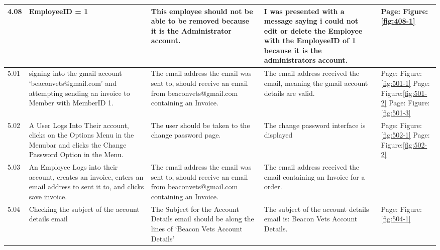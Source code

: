 \begin{flushleft}
\begin{longtable}{|p{1.0cm}|p{2.5cm}|p{3cm}|p{3.0cm}|p{2.5cm}|}
	4.08 &  EmployeeID = 1 & This employee should not be able to be removed because it is the Administrator account.& I was presented with a message saying i could not edit or delete the Employee with the EmployeeID of 1 because it is the administrators account. &  Page:\pageref{fig:408-1}  \newline Figure:\ref{fig:408-1}\\ \hline
	5.01 &  signing into the gmail account `beaconvets@gmail.com' and attempting sending an invoice to Member with MemberID 1.  & The email address the email was sent to, should receive an email from beaconvets@gmail.com containing an Invoice. & The email address received the email, meaning the gmail account details are valid. & Page:\pageref{fig:501-1}  \newline Figure:\ref{fig:501-1} \newline \newline  Page:\pageref{fig:501-2}  \newline Figure:\ref{fig:501-2}  \newline \newline  Page:\pageref{fig:501-3}  \newline Figure:\ref{fig:501-3}\\ \hline
	5.02 & A User Logs Into Their account, clicks on the Options Menu in the Menubar and clicks the Change Password Option in the Menu.& The user should be taken to the change password page. & The change password interface is displayed& Page:\pageref{fig:502-1}  \newline Figure:\ref{fig:502-1} \newline \newline  Page:\pageref{fig:502-2}  \newline Figure:\ref{fig:502-2}  \\ \hline
	5.03 & An Employee Logs into their account, creates an invoice, enters an email address to sent it to, and clicks save invoice. & The email address the email was sent to, should receive an email from beaconvets@gmail.com containing an Invoice. &  The email address received the email containing an Invoice for a order. & \\ \hline
	5.04 & Checking the subject of the account details email & The Subject for the Account Details email should be along the lines of  `Beacon Vets Account Details' & The subject of the account details email is: Beacon Vets Account Details. &  Page:\pageref{fig:504-1}  \newline Figure:\ref{fig:504-1}\\ \hline

\end{longtable}
\end{flushleft}
